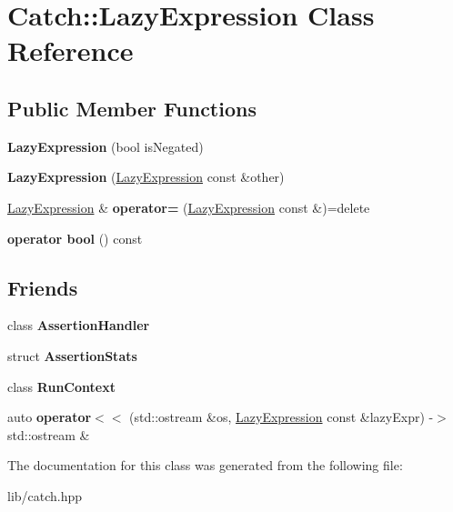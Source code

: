 \hypertarget{class_catch_1_1_lazy_expression}{}\section{Catch\+:\+:Lazy\+Expression Class Reference}
\label{class_catch_1_1_lazy_expression}
\subsection*{Public Member Functions}
\begin{DoxyCompactItemize}
\item 
\mbox{\label{class_catch_1_1_lazy_expression_a47186c2487bd4bf871e870ba8048553a}} 
{\bfseries Lazy\+Expression} (bool is\+Negated)
\item 
\mbox{\label{class_catch_1_1_lazy_expression_ab82d5e94df0e159b018fbde0170e46f8}} 
{\bfseries Lazy\+Expression} (\mbox{\hyperlink{class_catch_1_1_lazy_expression}{Lazy\+Expression}} const \&other)
\item 
\mbox{\label{class_catch_1_1_lazy_expression_ae4ae00d4f36f084c369f2da36565a822}} 
\mbox{\hyperlink{class_catch_1_1_lazy_expression}{Lazy\+Expression}} \& {\bfseries operator=} (\mbox{\hyperlink{class_catch_1_1_lazy_expression}{Lazy\+Expression}} const \&)=delete
\item 
\mbox{\label{class_catch_1_1_lazy_expression_acdb846cb230cecfc6aca7a925b31fbca}} 
{\bfseries operator bool} () const
\end{DoxyCompactItemize}
\subsection*{Friends}
\begin{DoxyCompactItemize}
\item 
\mbox{\label{class_catch_1_1_lazy_expression_a4301a3aa57b612dd8b6ef8461742ecab}} 
class {\bfseries Assertion\+Handler}
\item 
\mbox{\label{class_catch_1_1_lazy_expression_a64019eb137f5ce447cdc71cb80b6e7a4}} 
struct {\bfseries Assertion\+Stats}
\item 
\mbox{\label{class_catch_1_1_lazy_expression_af3aa096bb29a772bc534830f29a2ce7a}} 
class {\bfseries Run\+Context}
\item 
\mbox{\label{class_catch_1_1_lazy_expression_aa01086581cab2fcd2d4580b8fa787dfc}} 
auto {\bfseries operator$<$$<$} (std\+::ostream \&os, \mbox{\hyperlink{class_catch_1_1_lazy_expression}{Lazy\+Expression}} const \&lazy\+Expr) -\/$>$ std\+::ostream \&
\end{DoxyCompactItemize}


The documentation for this class was generated from the following file\+:\begin{DoxyCompactItemize}
\item 
lib/catch.\+hpp\end{DoxyCompactItemize}
